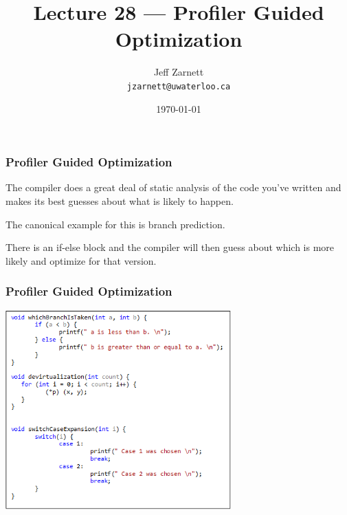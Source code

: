 

\title{Lecture 28 --- Profiler Guided Optimization }

\author{Jeff Zarnett \\ \small \texttt{jzarnett@uwaterloo.ca}}
\date{\today}




\begin{frame}
  \titlepage

 \end{frame}

\begin{frame}
\frametitle{Profiler Guided Optimization}


The compiler does a great deal of static analysis of the code you've written and makes its best guesses about what is likely to happen. 

The canonical example for this is branch prediction. 

There is an if-else block and the compiler will then guess about which is more likely and optimize for that version. 

\end{frame}



\begin{frame}
\frametitle{Profiler Guided Optimization}


\begin{center}
	\includegraphics[width=0.65\textwidth]{images/4621codesnippet.png}
\end{center}

\end{frame}



